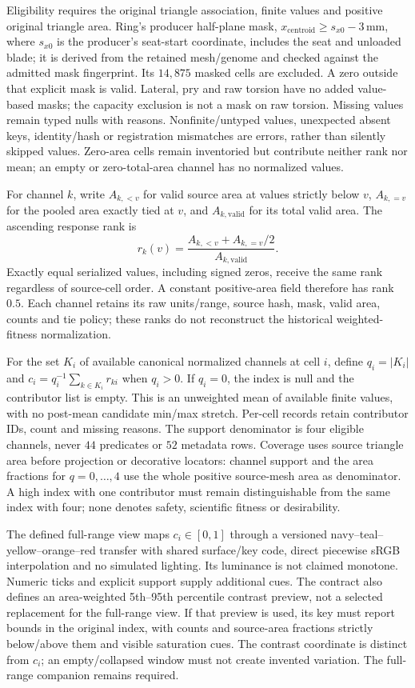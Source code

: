 Eligibility requires the original triangle association, finite values and positive original triangle area. Ring's producer half-plane mask, $x_{\mathrm{centroid}}\ge s_{x0}-3\,\mathrm{mm}$, where $s_{x0}$ is the producer's seat-start coordinate, includes the seat and unloaded blade; it is derived from the retained mesh/genome and checked against the admitted mask fingerprint. Its $14{,}875$ masked cells are excluded. A zero outside that explicit mask is valid. Lateral, pry and raw torsion have no added value-based masks; the capacity exclusion is not a mask on raw torsion. Missing values remain typed nulls with reasons. Nonfinite/untyped values, unexpected absent keys, identity/hash or registration mismatches are errors, rather than silently skipped values. Zero-area cells remain inventoried but contribute neither rank nor mean; an empty or zero-total-area channel has no normalized values.

For channel $k$, write $A_{k,<v}$ for valid source area at values strictly below $v$, $A_{k,=v}$ for the pooled area exactly tied at $v$, and $A_{k,\mathrm{valid}}$ for its total valid area. The ascending response rank is
\begin{equation}
 r_k(v)=\frac{A_{k,<v}+A_{k,=v}/2}{A_{k,\mathrm{valid}}}.
\end{equation}
Exactly equal serialized values, including signed zeros, receive the same rank regardless of source-cell order. A constant positive-area field therefore has rank $0.5$. Each channel retains its raw units/range, source hash, mask, valid area, counts and tie policy; these ranks do not reconstruct the historical weighted-fitness normalization.

For the set $K_i$ of available canonical normalized channels at cell $i$, define $q_i=|K_i|$ and $c_i=q_i^{-1}\sum_{k\in K_i}r_{ki}$ when $q_i>0$. If $q_i=0$, the index is null and the contributor list is empty. This is an unweighted mean of available finite values, with no post-mean candidate min/max stretch. Per-cell records retain contributor IDs, count and missing reasons. The support denominator is four eligible channels, never $44$ predicates or $52$ metadata rows. Coverage uses source triangle area before projection or decorative locators: channel support and the area fractions for $q=0,\ldots,4$ use the whole positive source-mesh area as denominator. A high index with one contributor must remain distinguishable from the same index with four; none denotes safety, scientific fitness or desirability.

The defined full-range view maps $c_i\in[0,1]$ through a versioned navy--teal--yellow--orange--red transfer with shared surface/key code, direct piecewise sRGB interpolation and no simulated lighting. Its luminance is not claimed monotone. Numeric ticks and explicit support supply additional cues. The contract also defines an area-weighted 5th--95th percentile contrast preview, not a selected replacement for the full-range view. If that preview is used, its key must report bounds in the original index, with counts and source-area fractions strictly below/above them and visible saturation cues. The contrast coordinate is distinct from $c_i$; an empty/collapsed window must not create invented variation. The full-range companion remains required.

